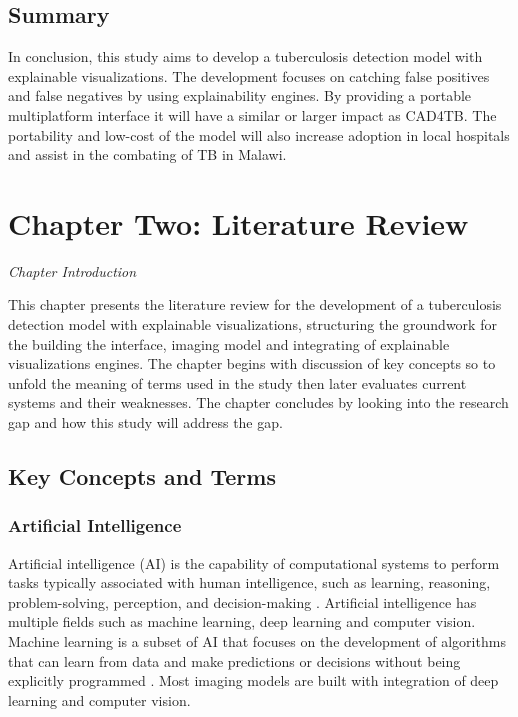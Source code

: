 \documentclass[12pt,a4paper]{article}
\begin{document}
\subsection{Summary}
In conclusion, this study aims to develop a tuberculosis detection model with explainable visualizations. The development focuses on catching false positives and false negatives by using explainability engines. By providing a portable multiplatform interface it will have a similar or larger impact as CAD4TB. The portability and low-cost of the model will also increase adoption in local hospitals and assist in the combating of TB in Malawi. 

\newpage

\section{Chapter Two: Literature Review}

\textit{Chapter Introduction}

This chapter presents the literature review for the development of a tuberculosis detection model with explainable visualizations, structuring the groundwork for the building the interface, imaging model and integrating of explainable visualizations engines.
The chapter begins with discussion of key concepts so to unfold the meaning of terms used in the study then later evaluates current systems and their weaknesses. The chapter concludes by looking into the research gap and how this study will address the gap.

\subsection{Key Concepts and Terms}
\subsubsection{Artificial Intelligence}
Artificial intelligence (AI) is the capability of computational systems to perform tasks typically associated with human intelligence, such as learning, reasoning, problem-solving, perception, and decision-making \citep{Mazeika2025}.
Artificial intelligence has multiple fields such as machine learning, deep learning and computer vision. Machine learning is a subset of AI that focuses on the development of algorithms that can learn from data and make predictions or decisions without being explicitly programmed \citep{Ciresan2012}. Most imaging models are built with integration of deep learning and computer vision.
\end{document}
